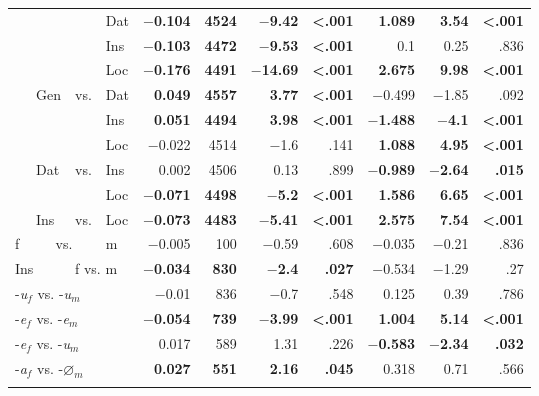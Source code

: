 \documentclass[output=paper, modfonts,newtxmath,hidelinks]{langscibook}
\begin{document}
\begin{table}
\begin{tabular}{*{4}l*{7}r}
~	&	~	&	~	&	Dat	&	\textbf{$-$0.104}	&	\textbf{4524}	& 	\textbf{$-$9.42}	&	\textbf{<.001}	& 	\textbf{1.089}	& 	\textbf{3.54}	& 	\textbf{<.001}\\
~	&	~	&	~	&	Ins	&	\textbf{$-$0.103}	&	\textbf{4472}	& 	\textbf{$-$9.53}	&	\textbf{<.001}	& 	0.1	& 	0.25	& 	.836	\\
~	&	~	&	~	&	Loc	&	\textbf{$-$0.176}	&	\textbf{4491}	& 	\textbf{$-$14.69}	&	\textbf{<.001}	& 	\textbf{2.675}	& 	\textbf{9.98}	& 	\textbf{<.001}	\\
~	&	Gen	&	vs.	&	Dat	&	\textbf{0.049}	&	\textbf{4557}	& 	\textbf{3.77}	&	\textbf{<.001}	& 	$-$0.499	& 	$-$1.85	& 	.092	\\
~	&	~	&	~	&	Ins	&	\textbf{0.051}	&	\textbf{4494}	& 	\textbf{3.98}	&	\textbf{<.001}	& 	\textbf{$-$1.488}	& 	\textbf{$-$4.1}	& 	\textbf{<.001}	\\
~	&	~	&	~	&	Loc	&	$-$0.022	&	4514	& 	$-$1.6	&	.141	& 	\textbf{1.088}	& 	\textbf{4.95}	& 	\textbf{<.001}	\\
~	&	Dat	&	vs.	&	Ins	&	0.002	&	4506	& 	0.13	&	.899	& 	\textbf{$-$0.989}	& 	\textbf{$-$2.64}	& 	\textbf{.015}	\\
~	&		&	~	&	Loc	&	\textbf{$-$0.071}	&	\textbf{4498}	& 	\textbf{$-$5.2}	&	\textbf{<.001}	& 	\textbf{1.586}	& 	\textbf{6.65}	& 	\textbf{<.001}	\\
~	& 	Ins	&	vs.	&	Loc	&	\textbf{$-$0.073}	&	\textbf{4483}	& 	\textbf{$-$5.41}	&	\textbf{<.001}	& 	\textbf{2.575}	& 	\textbf{7.54}	& 	\textbf{<.001}	\\
    \midrule
    f & \multicolumn{2}{c}{vs.} &  m & $-$0.005 &	100 &	$-$0.59 &	.608 &	$-$0.035 &	$-$0.21 &	.836\\
    \midrule
	\multicolumn{2}{l}{Ins} & \multicolumn{2}{l}{f vs. m} 	&	\textbf{$-$0.034}	&	\textbf{830}	&	\textbf{$-$2.4}	&	\textbf{.027}	&	$-$0.534	&	$-$1.29	&	.27	\\
	\multicolumn{4}{l}{-\textit{u$_f$} vs. -\textit{u$_m$}}	&	$-$0.01	&	836	&	$-$0.7	&	.548	&	0.125	&	0.39	&	.786	\\
	\multicolumn{4}{l}{-\textit{e$_f$} vs. -\textit{e$_m$}}	& 	\textbf{$-$0.054}	& 	\textbf{739}	&	\textbf{$-$3.99}	&	\textbf{<.001}	&	\textbf{1.004}	&	\textbf{5.14}	&	\textbf{<.001}	\\
 	\multicolumn{4}{l}{-\textit{e$_f$} vs. -\textit{u$_m$}} &	0.017	&	589	&	1.31	&	.226	&	 \textbf{$-$0.583}	&	\textbf{$-$2.34}	&	\textbf{.032}	\\
    \multicolumn{4}{l}{-\textit{a$_f$} vs. -\textit{$\varnothing_m$}} & \textbf{0.027} &	\textbf{551} &	\textbf{2.16} &	\textbf{.045} &	0.318 &	0.71 &	.566\\
  \lspbottomrule	
 \end{tabular}
\end{table}
\end{document}
